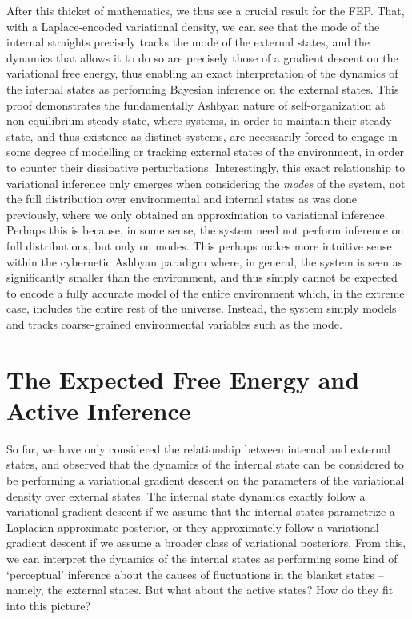 After this thicket of mathematics, we thus see a crucial result for the FEP. That, with a Laplace-encoded variational density, we can see that the mode of the internal straights precisely tracks the mode of the external states, and the dynamics that allows it to do so are precisely those of a gradient descent on the variational free energy, thus enabling an exact interpretation of the dynamics of the internal states as performing Bayesian inference on the external states. This proof demonstrates the fundamentally Ashbyan nature of self-organization at non-equilibrium steady state, where systems, in order to maintain their steady state, and thus existence as distinct systems, are necessarily forced to engage in some degree of modelling or tracking external states of the environment, in order to counter their dissipative perturbations. Interestingly, this exact relationship to variational inference only emerges when considering the \emph{modes} of the system, not the full distribution over environmental and internal states as was done previously, where we only obtained an approximation to variational inference. Perhaps this is because, in some sense, the system need not perform inference on full distributions, but only on modes. This perhaps makes more intuitive sense within the cybernetic Ashbyan paradigm where, in general, the system is seen as significantly smaller than the environment, and thus simply cannot be expected to encode a fully accurate model of the entire environment which, in the extreme case, includes the entire rest of the universe. Instead, the system simply models and tracks coarse-grained environmental variables such as the mode.

\section{The Expected Free Energy and Active Inference}
So far, we have only considered the relationship between internal and external states, and observed that the dynamics of the internal state can be considered to be performing a variational gradient descent on the parameters of the variational density over external states. The internal state dynamics exactly follow a variational gradient descent if we assume that the internal states parametrize a Laplacian approximate posterior, or they approximately follow a variational gradient descent if we assume a broader class of variational posteriors. From this, we can interpret the dynamics of the internal states as performing some kind of `perceptual' inference about the causes of fluctuations in the blanket states -- namely, the external states. But what about the active states? How do they fit into this picture? 

